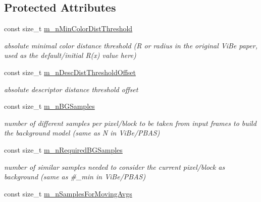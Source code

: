 \subsection*{Protected Attributes}
\begin{DoxyCompactItemize}
\item 
const size\+\_\+t \mbox{\hyperlink{class_background_subtractor_su_b_s_e_n_s_e_ae0ebf701652a66bbdb0472d6f091e34d}{m\+\_\+n\+Min\+Color\+Dist\+Threshold}}
\begin{DoxyCompactList}\small\item\em absolute minimal color distance threshold (\textquotesingle{}R\textquotesingle{} or \textquotesingle{}radius\textquotesingle{} in the original Vi\+Be paper, used as the default/initial \textquotesingle{}R(x)\textquotesingle{} value here) \end{DoxyCompactList}\item 
const size\+\_\+t \mbox{\hyperlink{class_background_subtractor_su_b_s_e_n_s_e_a79fe0f1657cd613b975d62f73e749ec2}{m\+\_\+n\+Desc\+Dist\+Threshold\+Offset}}
\begin{DoxyCompactList}\small\item\em absolute descriptor distance threshold offset \end{DoxyCompactList}\item 
const size\+\_\+t \mbox{\hyperlink{class_background_subtractor_su_b_s_e_n_s_e_ad783b71b5b942c4018d27cf38b7d7225}{m\+\_\+n\+B\+G\+Samples}}
\begin{DoxyCompactList}\small\item\em number of different samples per pixel/block to be taken from input frames to build the background model (same as \textquotesingle{}N\textquotesingle{} in Vi\+Be/\+P\+B\+AS) \end{DoxyCompactList}\item 
const size\+\_\+t \mbox{\hyperlink{class_background_subtractor_su_b_s_e_n_s_e_aca07c4307021623f9055832506cad1d6}{m\+\_\+n\+Required\+B\+G\+Samples}}
\begin{DoxyCompactList}\small\item\em number of similar samples needed to consider the current pixel/block as \textquotesingle{}background\textquotesingle{} (same as \textquotesingle{}\#\+\_\+min\textquotesingle{} in Vi\+Be/\+P\+B\+AS) \end{DoxyCompactList}\item 
const size\+\_\+t \mbox{\hyperlink{class_background_subtractor_su_b_s_e_n_s_e_acd112ccb067f76e370400565fa09ee49}{m\+\_\+n\+Samples\+For\+Moving\+Avgs}}

\end{DoxyCompactItemize}
